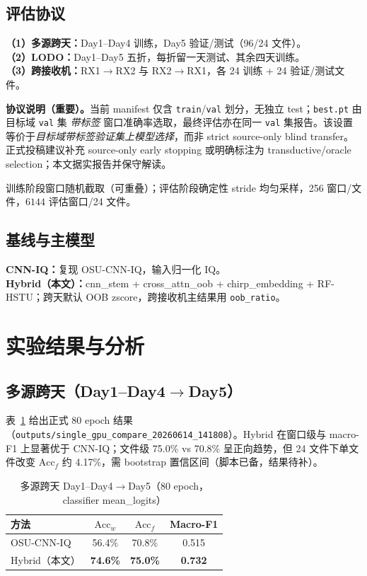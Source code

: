 \documentclass[journal]{IEEEtran}
\begin{document}
\subsection{评估协议}
\textbf{（1）多源跨天：}Day1--Day4 训练，Day5 验证/测试（96/24 文件）。\\
\textbf{（2）LODO：}Day1--Day5 五折，每折留一天测试、其余四天训练。\\
\textbf{（3）跨接收机：}RX1$\rightarrow$RX2 与 RX2$\rightarrow$RX1，各 24 训练 + 24 验证/测试文件。

\textbf{协议说明（重要）。}当前 manifest 仅含 \texttt{train}/\texttt{val} 划分，无独立 test；\texttt{best.pt} 由目标域 \texttt{val} 集 \emph{带标签} 窗口准确率选取，最终评估亦在同一 \texttt{val} 集报告。该设置等价于\emph{目标域带标签验证集上模型选择}，而非 strict source-only blind transfer。正式投稿建议补充 source-only early stopping 或明确标注为 transductive/oracle selection；本文据实报告并保守解读。

训练阶段窗口随机截取（可重叠）；评估阶段确定性 stride 均匀采样，256 窗口/文件，$6144$ 评估窗口/24 文件。

\subsection{基线与主模型}
\textbf{CNN-IQ：}复现 OSU-CNN-IQ，输入归一化 IQ。\\
\textbf{Hybrid（本文）：}cnn\_stem + cross\_attn\_oob + chirp\_embedding + RF-HSTU；跨天默认 OOB zscore，跨接收机主结果用 \texttt{oob\_ratio}。

\section{实验结果与分析}

\subsection{多源跨天（Day1--Day4$\rightarrow$Day5）}
表~\ref{tab:day15} 给出正式 80 epoch 结果（\texttt{outputs/single\_gpu\_compare\_20260614\_141808}）。Hybrid 在窗口级与 macro-F1 上显著优于 CNN-IQ；文件级 75.0\% vs 70.8\% 呈正向趋势，但 24 文件下单文件改变 $\mathrm{Acc}_f$ 约 4.17\%，需 bootstrap 置信区间（脚本已备，结果待补）。

\begin{table}[!t]
\caption{多源跨天 Day1--Day4$\rightarrow$Day5（80 epoch，classifier mean\_logits）}
\label{tab:day15}
\centering
\begin{tabular}{lccc}
\toprule
方法 & $\mathrm{Acc}_w$ & $\mathrm{Acc}_f$ & Macro-F1 \\
\midrule
OSU-CNN-IQ & 56.4\% & 70.8\% & 0.515 \\
Hybrid（本文） & \textbf{74.6\%} & \textbf{75.0\%} & \textbf{0.732} \\
\bottomrule
\end{tabular}
\end{table}
\end{document}

